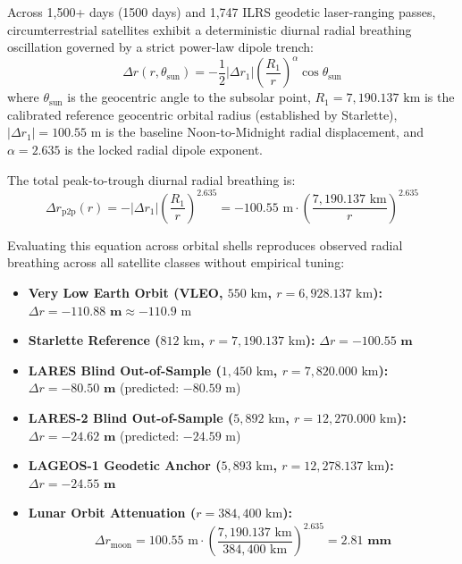 \documentclass[11pt,a4paper]{article}
\begin{document}
Across 1,500+ days (1500 days) and 1,747 ILRS geodetic laser-ranging passes, circumterrestrial satellites exhibit a deterministic diurnal radial breathing oscillation governed by a strict power-law dipole trench:
\begin{equation}
\Delta r(r, \theta_{\text{sun}}) = -\frac{1}{2} |\Delta r_1| \left(\frac{R_1}{r}\right)^\alpha \cos\theta_{\text{sun}}
\label{eq:dipole_trench}
\end{equation}
where $\theta_{\text{sun}}$ is the geocentric angle to the subsolar point, $R_1 = 7{,}190.137\text{ km}$ is the calibrated reference geocentric orbital radius (established by Starlette), $|\Delta r_1| = 100.55\text{ m}$ is the baseline Noon-to-Midnight radial displacement, and $\alpha = 2.635$ is the locked radial dipole exponent.

The total peak-to-trough diurnal radial breathing is:
\begin{equation}
\Delta r_{\text{p2p}}(r) = -|\Delta r_1| \left(\frac{R_1}{r}\right)^{2.635} = -100.55\text{ m} \cdot \left(\frac{7{,}190.137\text{ km}}{r}\right)^{2.635}
\label{eq:dipole_p2p}
\end{equation}

Evaluating this equation across orbital shells reproduces observed radial breathing across all satellite classes without empirical tuning:
\begin{itemize}
    \item \textbf{Very Low Earth Orbit (VLEO, $550\text{ km}$, $r = 6{,}928.137\text{ km}$):} $\Delta r = \mathbf{-110.88\text{ m}} \approx -110.9\text{ m}$
    \item \textbf{Starlette Reference ($812\text{ km}$, $r = 7{,}190.137\text{ km}$):} $\Delta r = \mathbf{-100.55\text{ m}}$
    \item \textbf{LARES Blind Out-of-Sample ($1{,}450\text{ km}$, $r = 7{,}820.000\text{ km}$):} $\Delta r = \mathbf{-80.50\text{ m}}$ (predicted: $-80.59\text{ m}$)
    \item \textbf{LARES-2 Blind Out-of-Sample ($5{,}892\text{ km}$, $r = 12{,}270.000\text{ km}$):} $\Delta r = \mathbf{-24.62\text{ m}}$ (predicted: $-24.59\text{ m}$)
    \item \textbf{LAGEOS-1 Geodetic Anchor ($5{,}893\text{ km}$, $r = 12{,}278.137\text{ km}$):} $\Delta r = \mathbf{-24.55\text{ m}}$
    \item \textbf{Lunar Orbit Attenuation ($r = 384{,}400\text{ km}$):}
    \begin{equation}
    \Delta r_{\text{moon}} = 100.55\text{ m} \cdot \left(\frac{7{,}190.137\text{ km}}{384{,}400\text{ km}}\right)^{2.635} = \mathbf{2.81\text{ mm}}
    \label{eq:lunar_attenuation}
    \end{equation}
\end{itemize}
\end{document}
